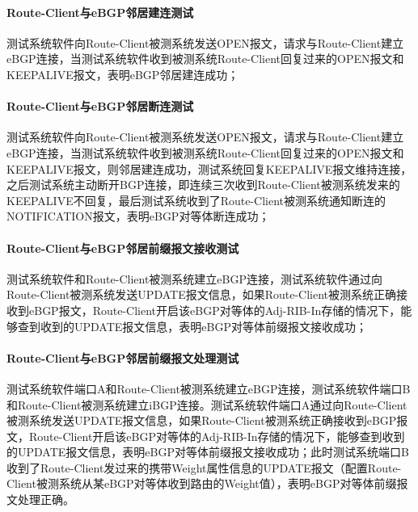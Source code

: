 \paragraph{Route-Client与eBGP邻居建连测试}
测试系统软件向Route-Client被测系统发送OPEN报文，请求与Route-Client建立eBGP连接，当测试系统软件收到被测系统Route-Client回复过来的OPEN报文和KEEPALIVE报文，表明eBGP邻居建连成功；

\paragraph{Route-Client与eBGP邻居断连测试}
测试系统软件向Route-Client被测系统发送OPEN报文，请求与Route-Client建立eBGP连接，当测试系统软件收到被测系统Route-Client回复过来的OPEN报文和KEEPALIVE报文，则邻居建连成功，测试系统回复KEEPALIVE报文维持连接，之后测试系统主动断开BGP连接，即连续三次收到Route-Client被测系统发来的KEEPALIVE不回复，最后测试系统收到了Route-Client被测系统通知断连的NOTIFICATION报文，表明eBGP对等体断连成功；

\paragraph{Route-Client与eBGP邻居前缀报文接收测试}
测试系统软件和Route-Client被测系统建立eBGP连接，测试系统软件通过向Route-Client被测系统发送UPDATE报文信息，如果Route-Client被测系统正确接收到eBGP报文，Route-Client开启该eBGP对等体的Adj-RIB-In存储的情况下，能够查到收到的UPDATE报文信息，表明eBGP对等体前缀报文接收成功；

\paragraph{Route-Client与eBGP邻居前缀报文处理测试}
测试系统软件端口A和Route-Client被测系统建立eBGP连接，测试系统软件端口B和Route-Client被测系统建立iBGP连接。测试系统软件端口A通过向Route-Client被测系统发送UPDATE报文信息，如果Route-Client被测系统正确接收到eBGP报文，Route-Client开启该eBGP对等体的Adj-RIB-In存储的情况下，能够查到收到的UPDATE报文信息，表明eBGP对等体前缀报文接收成功；此时测试系统端口B收到了Route-Client发过来的携带Weight属性信息的UPDATE报文（配置Route-Client被测系统从某eBGP对等体收到路由的Weight值），表明eBGP对等体前缀报文处理正确。



